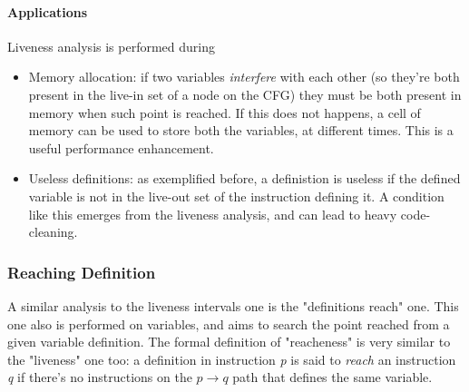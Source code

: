 \documentclass[10pt,a4paper]{article}
\begin{document}
				 \paragraph{Applications}
				 	Liveness analysis is performed during
				 	\begin{itemize}
				 		\item Memory allocation: if two variables \emph{interfere} with each other (so they're both present in the live-in set of a node on the CFG) they must be both present in memory when such point is reached. If this does not happens, a cell of memory can be used to store both the variables, at different times. This is a useful performance enhancement. 
				 		\item Useless definitions: as exemplified before, a definistion is useless if the defined variable is not in the live-out set of the instruction defining it. A condition like this emerges from the liveness analysis, and can lead to heavy code-cleaning. 
				 	\end{itemize}
		 	
		 	\subsubsection{Reaching Definition}
		 		A similar analysis to the liveness intervals one is the "definitions reach" one. This one also is performed on variables, and aims to search the point reached from a given variable definition. The formal definition of "reacheness" is very similar to the "liveness" one too: a definition in instruction \emph{p} is said to \emph{reach} an instruction \emph{q} if there's no instructions on the $p \rightarrow q$ path that defines the same variable. 
		 		
\end{document}
